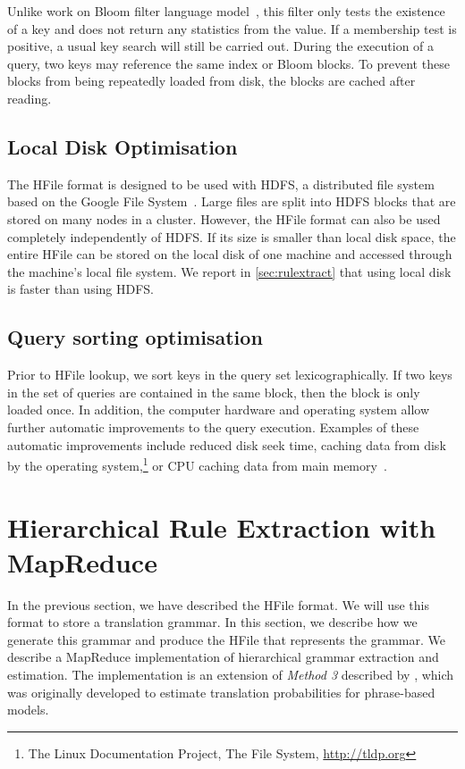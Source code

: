 Unlike work on Bloom filter language
model~\citep{talbot-osborne:2007:ACL,talbot-osborne:2007:EMNLP-CoNLL}, this
filter only tests the existence of a key and does not return any statistics from
the value. If a membership test is positive, a usual key search will
still be carried out. During the execution of a query, two keys may
reference the same index or Bloom blocks. To prevent these blocks from being
repeatedly loaded from disk, the blocks are cached after reading.

\subsection{Local Disk Optimisation}

The HFile format is designed to be used with HDFS, a distributed file system
based on the Google File System~\citep{ghemawat-gobioff-leung:2003:OSP}. Large
files are split into HDFS blocks that are stored on many nodes in a cluster.
However, the HFile format can also be used completely independently of HDFS. If
its size is smaller than local disk space, the entire HFile can be stored on the local
disk of one machine and accessed through the machine's local file system. We
report in \autoref{sec:rulextract} that using local disk
is faster than using HDFS.

\subsection{Query sorting optimisation}
\label{sec:querySortingOptimization}

Prior to HFile lookup, we sort keys in the query set lexicographically. If two
keys in the set of queries are contained in the same block, then the block is
only loaded once. In addition, the computer hardware and operating system allow
further automatic improvements to the query execution. Examples of these
automatic improvements include reduced disk seek time,
caching data from
disk by the operating system,\footnote{The Linux Documentation Project, The File System, \url{http://tldp.org}}
or CPU caching data from main memory~\citep{patterson-hennessy:2005:COA}.

\section{Hierarchical Rule Extraction with MapReduce}
\label{sec:rulextractMapReduce}

In the previous section, we have described the HFile format. We will use
this format to store a translation grammar. In this
section, we describe how we generate this grammar and produce the HFile
that represents the grammar.
We describe a MapReduce implementation of hierarchical grammar
extraction and estimation. The implementation is an
extension of \emph{Method 3} described by
\citet{dyer-cordova-mont-lin:2008:WMT}, which was originally developed
to estimate translation probabilities for phrase-based models.


